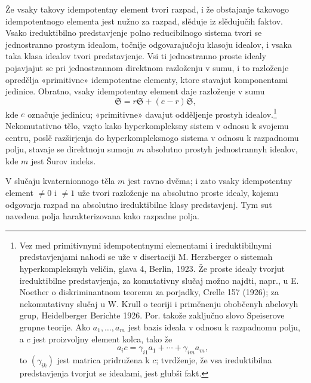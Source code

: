 \documentclass[11pt]{article}
\newcommand{\mS}{\mathfrak{S}}
\begin{document}
\noindent Že vsaky takovy idempotentny element tvori razpad, i že obstajanje takovogo idempotentnogo elementa jest nužno za razpad, slěduje iz slědujučih faktov. Vsako ireduktibilno predstavjenje polno reducibilnogo sistema tvori se jednostranno prostym idealom, točnije odgovarajučoju klasoju idealov, i vsaka taka klasa idealov tvori predstavjenje. Vsi ti jednostranno proste idealy pojavjajut se pri jednostrannom direktnom razloženju v sumu, i to razloženje opredělja «primitivne» idempotentne elementy, ktore stavajut komponentami jedinice. Obratno, vsaky idempotentny element daje razloženje v sumu
\[
        \mS=r\mS+(e-r)\mS,
\]
kde $e$ označuje jedinicu; «primitivne» davajut odděljenje prostyh idealov.\footnote{Vez med primitivnymi idempotentnymi elementami i ireduktibilnymi predstavjenjami nahodi se uže v disertaciji M. Herzberger o sistemah hyperkompleksnyh veličin, glava 4, Berlin, 1923. Že proste idealy tvorjut ireduktibilne predstavjenja, za komutativny slučaj možno najdti, napr., u E. Noether o diskriminantnom teoremu za porjadky, Crelle 157 (1926); za nekomutativny slučaj u W. Krull o teoriji i priměnenju obobčenyh abelovyh grup, Heidelberger Berichte 1926. Por. takože zaključno slovo Speiserove grupne teorije. Ako $a_1,\ldots,a_m$ jest bazis ideala v odnosu k razpadnomu polju, a $c$ jest proizvoljny element kolca, tako že
\[
        a_i c=\gamma_{i1}a_1+\cdots+\gamma_{im}a_m,
\]
to $(\gamma_{ik})$ jest matrica pridružena k $c$; tvrdženje, že vsa ireduktibilna predstavjenja tvorjut se idealami, jest glubši fakt.} Nekomutativno tělo, vzęto kako hyperkompleksny sistem v odnosu k svojemu centru, poslě razširjenja do hyperkompleksnogo sistema v odnosu k razpadnomu polju, stavaje se direktnoju sumoju $m$ absolutno prostyh jednostrannyh idealov, kde $m$ jest Šurov indeks.

\medskip

\noindent V slučaju kvaternionnogo těla $m$ jest ravno dvěma; i zato vsaky idempotentny element $\ne0$ i $\ne1$ uže tvori razloženje na absolutno proste idealy, kojemu odgovarja razpad na absolutno ireduktibilne klasy predstavjenj. Tym sut navedena polja harakterizovana kako razpadne polja.
\end{document}
